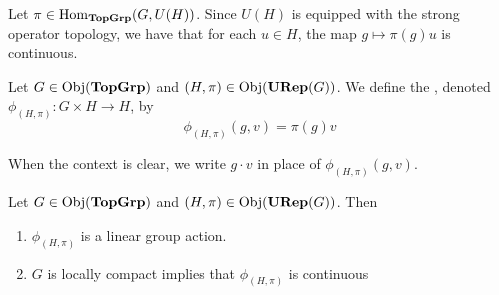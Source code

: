 \documentclass{book}
\begin{document}
	\begin{note}
		Let $\pi \in \operatorname{Hom}_{\operatorname*{\text{\textbf{TopGrp}}}}(G, U(H))$. Since $U(H)$ is equipped with the strong operator topology, we have that for each $u \in H$, the map $g \mapsto \pi(g)u$ is continuous.  
	\end{note}
	
	\begin{defn}
		Let $G \in \operatorname{Obj}(\operatorname*{\text{\textbf{TopGrp}}})$ and $(H, \pi) \in \operatorname{Obj}(\operatorname*{\text{\textbf{URep}}}(G))$. We define the , denoted $\phi_{(H, \pi)}: G \times H \rightarrow H$, by 
		$$\phi_{(H, \pi)}(g, v) = \pi(g)v$$ 
	\end{defn}
	
	\begin{note}
		When the context is clear, we write $g \cdot v$ in place of $\phi_{(H, \pi)}(g, v)$. 
	\end{note}
	
	\begin{ex}
		Let $G \in \operatorname{Obj}(\operatorname*{\text{\textbf{TopGrp}}})$ and $(H, \pi) \in \operatorname{Obj}(\operatorname*{\text{\textbf{URep}}}(G))$. Then 
		\begin{enumerate}
			\item $\phi_{(H, \pi)}$ is a linear group action. 
			\item $G$ is locally compact implies that $\phi_{(H, \pi)}$ is continuous
		\end{enumerate}
	\end{ex}
	
\end{document}
